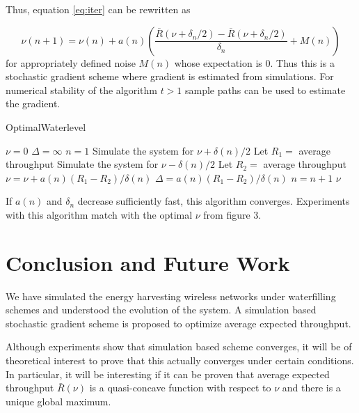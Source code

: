 \documentclass[a4paper,11pt]{article}
\begin{document}
Thus, equation \ref{eq:iter} can be rewritten as 

\begin{equation}
\nu(n+1) = \nu(n) + a(n)\left (\frac{\bar{R}(\nu + \delta_n/2) -  \bar{R}(\nu + \delta_n/2 ) }{\delta_n} + M(n) \right)
\end{equation}
for appropriately defined noise $M(n)$ whose expectation is 0. 
Thus this is a stochastic gradient scheme where gradient is estimated from simulations.
For numerical stability of the algorithm $t >1 $ sample paths can be used to estimate the gradient.

	\begin{algorithm}[H]
		\caption{OptimalWaterlevel}
		\label{algo:LearningGraph}
		\begin{algorithmic}[1]
			\STATE $\nu  = 0$
			\STATE $\Delta = \infty$
			\STATE $n = 1$
			\WHILE{$\Delta < \epsilon$}
			\STATE Simulate the system for $\nu + \delta(n)/2$
			\STATE Let $R_1 = $ average throughput
			\STATE Simulate the system for $\nu - \delta(n)/2$
			\STATE Let $R_2 = $ average throughput
			\STATE $\nu  = \nu + a(n)(R_1 - R_2)/\delta(n)$
			\STATE $\Delta = a(n)(R_1 - R_2)/\delta(n)$
			\STATE $n = n+1$
			\ENDWHILE
			\RETURN $\nu$
		\end{algorithmic}
	\end{algorithm}

If $a(n)$ and $\delta_n$ decrease sufficiently fast, this algorithm converges.
Experiments with this algorithm match with the optimal $\nu$ from figure 3.

\section{Conclusion and Future Work}
We have simulated the energy harvesting wireless networks under waterfilling schemes
and understood the evolution of the system.
A simulation based stochastic gradient scheme is proposed to optimize average expected throughput. 

Although experiments show that simulation based scheme converges, it will be of theoretical interest to prove that this actually converges under certain conditions. In particular, it will be interesting if it can be proven that average expected throughput $\bar{R}(\nu)$ is a quasi-concave function with respect to $\nu$ and there is a unique global maximum.
\end{document}
